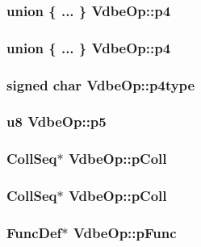 \subsubsection{\setlength{\rightskip}{0pt plus 5cm}union \{ ... \}   \bf{Vdbe\-Op::p4}}\label{structVdbeOp_0a71cd118ade78bf348569704da135fa}


\subsubsection{\setlength{\rightskip}{0pt plus 5cm}union \{ ... \}   \bf{Vdbe\-Op::p4}}\label{structVdbeOp_d78da860cd8347eac6d357137ebbef8f}


\subsubsection{\setlength{\rightskip}{0pt plus 5cm}signed char \bf{Vdbe\-Op::p4type}}\label{structVdbeOp_f45295c7cf5374d34e2ddf5de379d76f}


\subsubsection{\setlength{\rightskip}{0pt plus 5cm}\bf{u8} \bf{Vdbe\-Op::p5}}\label{structVdbeOp_149aab2bfcf29260e966153af3aa97b4}


\subsubsection{\setlength{\rightskip}{0pt plus 5cm}\bf{Coll\-Seq}$\ast$ \bf{Vdbe\-Op::p\-Coll}}\label{structVdbeOp_9ad63c762417bf947cfd0646a48368f6}


\subsubsection{\setlength{\rightskip}{0pt plus 5cm}\bf{Coll\-Seq}$\ast$ \bf{Vdbe\-Op::p\-Coll}}\label{structVdbeOp_9ad63c762417bf947cfd0646a48368f6}


\subsubsection{\setlength{\rightskip}{0pt plus 5cm}\bf{Func\-Def}$\ast$ \bf{Vdbe\-Op::p\-Func}}\label{structVdbeOp_2ea0c1b60a8f4aad01e7d1a764be621f}


